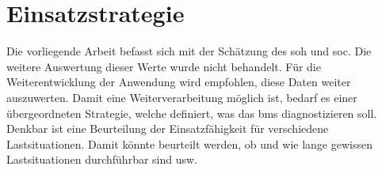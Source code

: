 \section{Einsatzstrategie}

Die vorliegende Arbeit befasst sich mit der Schätzung des
\gls{soh} und \gls{soc}. Die weitere Auswertung dieser
Werte wurde nicht behandelt. Für die Weiterentwicklung der
Anwendung wird empfohlen, diese Daten weiter auszuwerten.
Damit eine Weiterverarbeitung möglich ist, bedarf es einer
übergeordneten Strategie, welche definiert, was das
\gls{bms} diagnostizieren soll. Denkbar ist eine Beurteilung
der Einsatzfähigkeit für verschiedene Lastsituationen.
Damit könnte beurteilt werden, ob und wie lange gewissen
Lastsituationen durchführbar sind usw.
